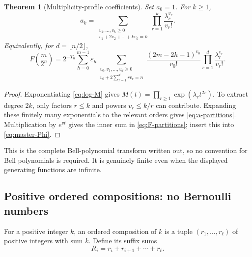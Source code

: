 \documentclass[11pt,a4paper]{article}
\numberwithin{equation}{section}
\newtheorem{theorem}{Theorem}[section]
\theoremstyle{definition}
\theoremstyle{remark}
\newcommand{\eps}{\varepsilon}
\begin{document}
\begin{theorem}[Multiplicity-profile coefficients]
\label{thm:Bell}
Set $a_0=1$. For $k\ge1$,
\begin{equation}
 \boxed{\displaystyle
 a_k=\sum_{\substack{v_1,\ldots,v_k\ge0\\
                         v_1+2v_2+\cdots+kv_k=k}}
           \prod_{r=1}^{k}\frac{\lambda_r^{v_r}}{v_r!}.}
 \label{eq:a-partitions}
\end{equation}
Equivalently, for $d=\lfloor n/2\rfloor$,
\begin{equation}
 \boxed{\displaystyle
 F\!\left(\frac m{2^n}\right)
 =2^{-T_n}\sum_{h=0}^{m-1}\eps_h
 \sum_{\substack{v_0,v_1,\ldots,v_d\ge0\\
                         v_0+2\sum_{r=1}^d rv_r=n}}
  \frac{(2m-2h-1)^{v_0}}{v_0!}
  \prod_{r=1}^d\frac{\lambda_r^{v_r}}{v_r!}.}
 \label{eq:F-partitions}
\end{equation}
\end{theorem}
\begin{proof}
Exponentiating \cref{eq:log-M} gives $M(t)=\prod_{r\ge1}\exp(\lambda_rt^{2r})$. To extract degree $2k$, only factors $r\le k$ and powers $v_r\le k/r$ can contribute. Expanding these finitely many exponentials to the relevant orders gives \cref{eq:a-partitions}. Multiplication by $e^{vt}$ gives the inner sum in \cref{eq:F-partitions}; insert this into \cref{eq:master-Phi}.
\end{proof}
This is the complete Bell-polynomial transform written out, so no convention for Bell polynomials is required. It is genuinely finite even when the displayed generating functions are infinite.

\subsection{Positive ordered compositions: no Bernoulli numbers}
\label{sec:compositions}
For a positive integer $k$, an ordered composition of $k$ is a tuple $(r_1,\ldots,r_\ell)$ of positive integers with sum $k$. Define its suffix sums
\begin{equation}
 R_i=r_i+r_{i+1}+\cdots+r_\ell.
 \label{eq:suffix}
\end{equation}
\end{document}
